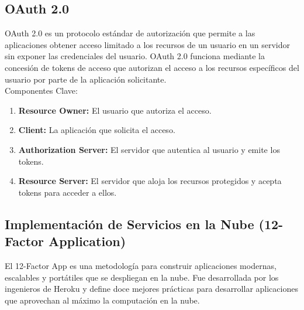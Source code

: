 \documentclass{article}
\begin{document}
\subsection{OAuth 2.0}
OAuth 2.0 es un protocolo estándar de autorización que permite a las aplicaciones obtener acceso limitado a los recursos de un usuario en un servidor sin exponer las credenciales del usuario. OAuth 2.0 funciona mediante la concesión de tokens de acceso que autorizan el acceso a los recursos específicos del usuario por parte de la aplicación solicitante.\\

Componentes Clave:
\begin{enumerate}
    \item \textbf{Resource Owner:} El usuario que autoriza el acceso.
    \item \textbf{Client:} La aplicación que solicita el acceso.
    \item \textbf{Authorization Server:} El servidor que autentica al usuario y emite los tokens.
    \item \textbf{Resource Server:} El servidor que aloja los recursos protegidos y acepta tokens para acceder a ellos.
\end{enumerate}

\subsection{Implementación de Servicios en la Nube (12-Factor Application)}
El 12-Factor App es una metodología para construir aplicaciones modernas, escalables y portátiles que se despliegan en la nube. Fue desarrollada por los ingenieros de Heroku y define doce mejores prácticas para desarrollar aplicaciones que aprovechan al máximo la computación en la nube.\\
\end{document}
